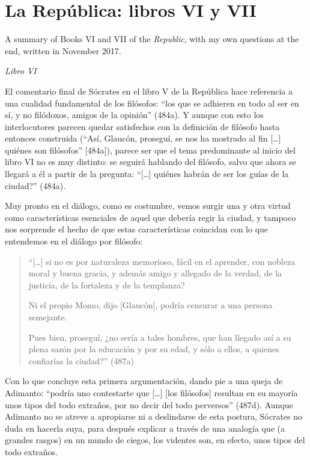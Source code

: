 \section{La República: libros VI y VII}
\label{section-republica-vi-vii}

A summary of Books VI and VII of the
\emph{Republic}, with my own questions at
the end, written in November 2017.

\medskip\noindent\emph{Libro VI}

El comentario final de Sócrates en el libro V
de la República hace referencia a una
cualidad fundamental de los filósofos: ``los
que se adhieren en todo al ser en sí, y no
filódoxos, amigos de la opinión'' (484a). Y
aunque con esto los interlocutores parecen
quedar satisfechos con la definición de
filósofo hasta entonces construida (``Así,
Glaucón, proseguí, se nos ha mostrado al fin
{[}\ldots{}] quiénes son filósofos'' [484a]),
parece ser que el tema predominante al inicio
del libro VI no es muy distinto: se seguirá
hablando del filósofo, salvo que ahora se
llegará a él a partir de la pregunta:
``[\ldots{}] quiénes habrán de ser los guías
de la ciudad?'' (484a).

Muy pronto en el diálogo, como es costumbre,
vemos surgir una y otra virtud como
características esenciales de aquel que
debería regir la ciudad, y tampoco nos
sorprende el hecho de que estas
características coincidan con lo que
entendemos en el diálogo por filósofo:

\begin{quote}
``[\ldots{}] si no es por naturaleza
memorioso, fácil en el aprender, con nobleza
moral y buena gracia, y además amigo y
allegado de la verdad, de la justicia, de la
fortaleza y de la templanza?

Ni el propio Momo, dijo [Glaucón], podría
censurar a una persona semejante.

Pues bien, proseguí, ¿no sería a tales
hombres, que han llegado así a su plena sazón
por la educación y por su edad, y sólo a
ellos, a quienes confiarías la ciudad?''
(487a)
\end{quote}

Con lo que concluye esta primera
argumentación, dando pie a una queja de
Adimanto: ``podría uno contestarte que
{[}\ldots{}] [los filósofos] resultan en su
mayoría unos tipos del todo extraños, por no
decir del todo perversos'' (487d). Aunque
Adimanto no se atreve a apropiarse ni a
deslindarse de esta postura, Sócrates no duda
en hacerla suya, para después explicar a
través de una analogía que (a grandes rasgos)
en un mundo de ciegos, los videntes son, en
efecto, unos tipos del todo extraños.

